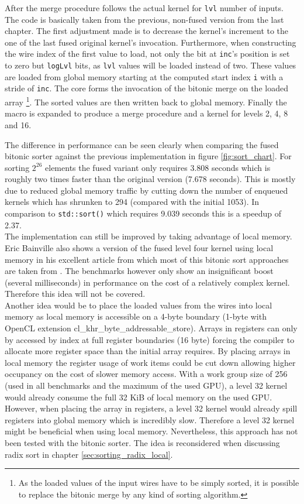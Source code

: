 After the merge procedure follows the actual kernel for \lstinline!lvl! number of inputs. The code is basically taken from the previous, non-fused version from the last chapter. The first adjustment made is to decrease the kernel's increment to the one of  the last fused original kernel's invocation. Furthermore, when constructing the wire index of the first value to load, not only the bit at \lstinline!inc!'s position is set to zero but \lstinline!logLvl! bits, as \lstinline!lvl! values will be loaded instead of two. These values are loaded from global memory starting at the computed start index \lstinline!i! with a stride of \lstinline!inc!. The core forms the invocation of the bitonic merge on the loaded array \footnote{As the loaded values of the input wires have to be simply sorted, it is possible to replace the bitonic merge by any kind of sorting algorithm.}. The sorted values are then written back to global memory.
Finally the macro is expanded to produce a merge procedure and a kernel for levels 2, 4, 8 and 16.

The difference in performance can be seen clearly when comparing the fused bitonic sorter against the previous implementation in figure \ref{fig:sort_chart}. For sorting $2^{26}$ elements the fused variant only requires 3.808 seconds which is roughly two times faster than the original version (7.678 seconds). This is mostly due to reduced global memory traffic by cutting down the number of enqueued kernels which has shrunken to 294 (compared with the initial 1053). In comparison to \lstinline!std::sort()! which requires 9.039 seconds this is a speedup of 2.37. \\
The implementation can still be improved by taking advantage of local memory. Eric Bainville also shows a version of the fused level four kernel using local memory in his excellent article from which most of this bitonic sort approaches are taken from \cite{sort_bealto}. The benchmarks however only show an insignificant boost (several milliseconds) in performance on the cost of a relatively complex kernel. Therefore this idea will not be covered. \\
Another idea would be to place the loaded values from the wires into local memory as local memory is accessible on a 4-byte boundary (1-byte with OpenCL extension cl\_khr\_byte\_addressable\_store). Arrays in registers can only by accessed by index at full register boundaries (16 byte) forcing the compiler to allocate more register space than the initial array requires. By placing arrays in local memory the register usage of work items could be cut down allowing higher occupancy on the cost of slower memory access. With a work group size of 256 (used in all benchmarks and the maximum of the used GPU), a level 32 kernel would already consume the full 32 KiB of local memory on the used GPU. However, when placing the array in registers, a level 32 kernel would already spill registers into global memory which is incredibly slow. Therefore a level 32 kernel might be beneficial when using local memory. Nevertheless, this approach has not been tested with the bitonic sorter. The idea is reconsidered when discussing radix sort in chapter \ref{sec:sorting_radix_local}.


